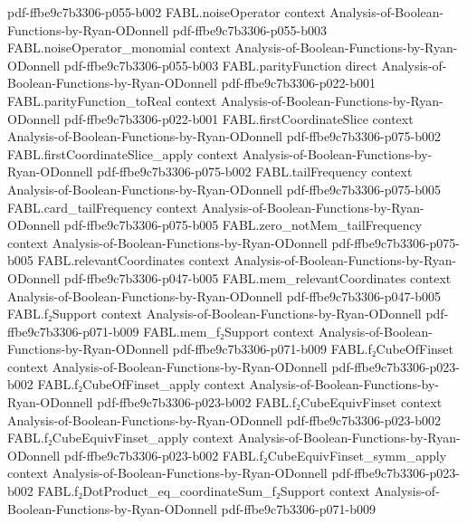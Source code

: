 \begin{theorem}
  {pdf-ffbe9c7b3306-p055-b002}
\proofstep
  {FABL.noiseOperator}
  {context}
  {Analysis-of-Boolean-Functions-by-Ryan-ODonnell}
  {pdf-ffbe9c7b3306-p055-b003}
\proofstep
  {FABL.noiseOperator_monomial}
  {context}
  {Analysis-of-Boolean-Functions-by-Ryan-ODonnell}
  {pdf-ffbe9c7b3306-p055-b003}
\proofstep
  {FABL.parityFunction}
  {direct}
  {Analysis-of-Boolean-Functions-by-Ryan-ODonnell}
  {pdf-ffbe9c7b3306-p022-b001}
\proofstep
  {FABL.parityFunction_toReal}
  {context}
  {Analysis-of-Boolean-Functions-by-Ryan-ODonnell}
  {pdf-ffbe9c7b3306-p022-b001}
\proofstep
  {FABL.firstCoordinateSlice}
  {context}
  {Analysis-of-Boolean-Functions-by-Ryan-ODonnell}
  {pdf-ffbe9c7b3306-p075-b002}
\proofstep
  {FABL.firstCoordinateSlice_apply}
  {context}
  {Analysis-of-Boolean-Functions-by-Ryan-ODonnell}
  {pdf-ffbe9c7b3306-p075-b002}
\proofstep
  {FABL.tailFrequency}
  {context}
  {Analysis-of-Boolean-Functions-by-Ryan-ODonnell}
  {pdf-ffbe9c7b3306-p075-b005}
\proofstep
  {FABL.card_tailFrequency}
  {context}
  {Analysis-of-Boolean-Functions-by-Ryan-ODonnell}
  {pdf-ffbe9c7b3306-p075-b005}
\proofstep
  {FABL.zero_notMem_tailFrequency}
  {context}
  {Analysis-of-Boolean-Functions-by-Ryan-ODonnell}
  {pdf-ffbe9c7b3306-p075-b005}
\proofstep
  {FABL.relevantCoordinates}
  {context}
  {Analysis-of-Boolean-Functions-by-Ryan-ODonnell}
  {pdf-ffbe9c7b3306-p047-b005}
\proofstep
  {FABL.mem_relevantCoordinates}
  {context}
  {Analysis-of-Boolean-Functions-by-Ryan-ODonnell}
  {pdf-ffbe9c7b3306-p047-b005}
\proofstep
  {FABL.f₂Support}
  {context}
  {Analysis-of-Boolean-Functions-by-Ryan-ODonnell}
  {pdf-ffbe9c7b3306-p071-b009}
\proofstep
  {FABL.mem_f₂Support}
  {context}
  {Analysis-of-Boolean-Functions-by-Ryan-ODonnell}
  {pdf-ffbe9c7b3306-p071-b009}
\proofstep
  {FABL.f₂CubeOfFinset}
  {context}
  {Analysis-of-Boolean-Functions-by-Ryan-ODonnell}
  {pdf-ffbe9c7b3306-p023-b002}
\proofstep
  {FABL.f₂CubeOfFinset_apply}
  {context}
  {Analysis-of-Boolean-Functions-by-Ryan-ODonnell}
  {pdf-ffbe9c7b3306-p023-b002}
\proofstep
  {FABL.f₂CubeEquivFinset}
  {context}
  {Analysis-of-Boolean-Functions-by-Ryan-ODonnell}
  {pdf-ffbe9c7b3306-p023-b002}
\proofstep
  {FABL.f₂CubeEquivFinset_apply}
  {context}
  {Analysis-of-Boolean-Functions-by-Ryan-ODonnell}
  {pdf-ffbe9c7b3306-p023-b002}
\proofstep
  {FABL.f₂CubeEquivFinset_symm_apply}
  {context}
  {Analysis-of-Boolean-Functions-by-Ryan-ODonnell}
  {pdf-ffbe9c7b3306-p023-b002}
\proofstep
  {FABL.f₂DotProduct_eq_coordinateSum_f₂Support}
  {context}
  {Analysis-of-Boolean-Functions-by-Ryan-ODonnell}
  {pdf-ffbe9c7b3306-p071-b009}
\proofstep

\end{theorem}
